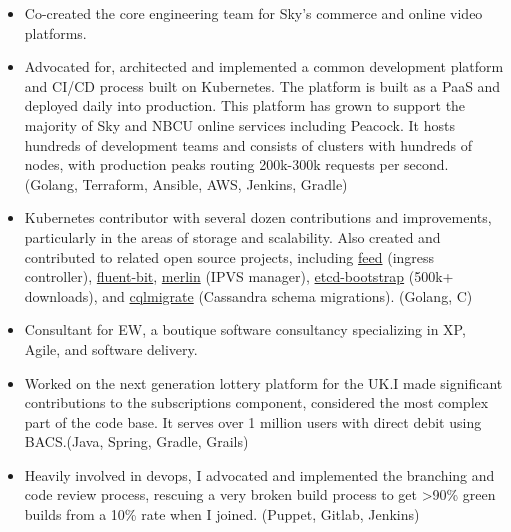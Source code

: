 \documentclass[11pt,a4paper,roman]{moderncv}
\begin{document}
\vspace{5mm}

\begin{itemize}
  \item Co-created the core engineering team for Sky's commerce and online video platforms.
  \item Advocated for, architected and implemented a common development platform and CI/CD process built on
        Kubernetes. The platform is built as a PaaS and deployed daily into production. This platform has
        grown to support the majority of Sky and NBCU online services including Peacock. It hosts hundreds
        of development teams and consists of clusters with hundreds of nodes, with production peaks routing
        200k-300k requests per second. (Golang, Terraform, Ansible, AWS, Jenkins, Gradle)
  \item Kubernetes contributor with several dozen contributions and improvements, particularly in the areas of storage
        and scalability. Also created and contributed to related open source projects, including
        \href{https://github.com/sky-uk/feed}{feed} (ingress controller), \href{https://fluentbit.io}{fluent-bit},
        \href{https://github.com/sky-uk/merlin}{merlin} (IPVS manager),
        \href{https://github.com/sky-uk/etcd-bootstrap}{etcd-bootstrap} (500k+ downloads), and
        \href{https://github.com/sky-uk/cqlmigrate}{cqlmigrate} (Cassandra schema migrations). (Golang, C)
\end{itemize}

\vspace{5mm}

\begin{itemize}
\item Consultant for EW, a boutique software consultancy specializing in XP, Agile, and software delivery.
\end{itemize}

\vspace{5mm}

\begin{itemize}
  \item Worked on the next generation lottery platform for the UK.\@ I made significant contributions
        to the subscriptions component, considered the most complex part of the code base. It serves
        over 1 million users with direct debit using BACS.\@ (Java, Spring, Gradle, Grails)
  \item Heavily involved in devops, I advocated and implemented the branching and code review process,
        rescuing a very broken build process to get \textgreater{}90\% green builds from a 10\% rate when I joined.
        (Puppet, Gitlab, Jenkins)
\end{itemize}
\end{document}
